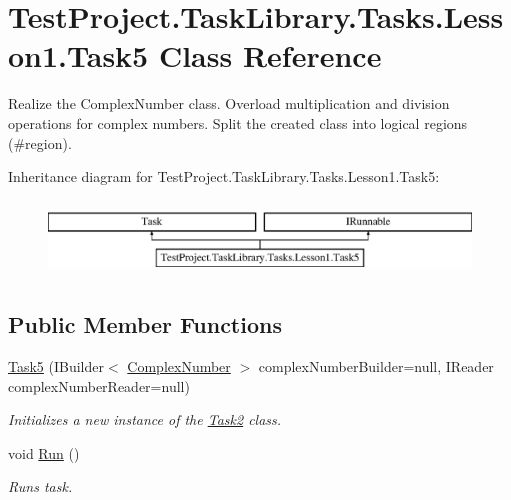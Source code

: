 \hypertarget{class_test_project_1_1_task_library_1_1_tasks_1_1_lesson1_1_1_task5}{}\section{Test\+Project.\+Task\+Library.\+Tasks.\+Lesson1.\+Task5 Class Reference}
\label{class_test_project_1_1_task_library_1_1_tasks_1_1_lesson1_1_1_task5}


Realize the Complex\+Number class. Overload multiplication and division operations for complex numbers. Split the created class into logical regions (\#region).  


Inheritance diagram for Test\+Project.\+Task\+Library.\+Tasks.\+Lesson1.\+Task5\+:\begin{figure}[H]
\begin{center}
\leavevmode
\includegraphics[height=2.000000cm]{class_test_project_1_1_task_library_1_1_tasks_1_1_lesson1_1_1_task5}
\end{center}
\end{figure}
\subsection*{Public Member Functions}
\begin{DoxyCompactItemize}
\item 
\mbox{\hyperlink{class_test_project_1_1_task_library_1_1_tasks_1_1_lesson1_1_1_task5_a972486a187db262632d1573616a39c4c}{Task5}} (I\+Builder$<$ \mbox{\hyperlink{class_test_project_1_1_task_library_1_1_tasks_1_1_lesson1_1_1_models_1_1_complex_number}{Complex\+Number}} $>$ complex\+Number\+Builder=null, I\+Reader complex\+Number\+Reader=null)
\begin{DoxyCompactList}\small\item\em Initializes a new instance of the \mbox{\hyperlink{class_test_project_1_1_task_library_1_1_tasks_1_1_lesson1_1_1_task2}{Task2}} class. \end{DoxyCompactList}\item 
void \mbox{\hyperlink{class_test_project_1_1_task_library_1_1_tasks_1_1_lesson1_1_1_task5_af7d77924eac62b3fe09bc77253ee565b}{Run}} ()
\begin{DoxyCompactList}\small\item\em Runs task. \end{DoxyCompactList}\end{DoxyCompactItemize}


